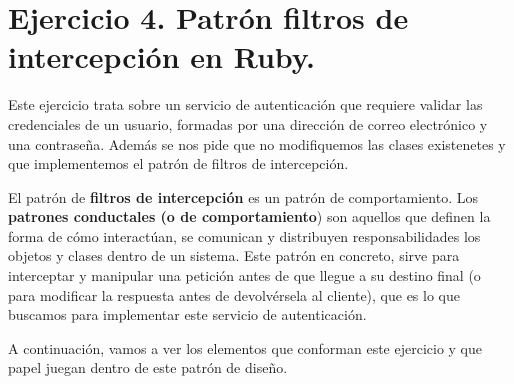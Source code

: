 \documentclass[a4paper,12pt]{article}
\begin{document}
		\newpage
	
	\section{Ejercicio 4. Patrón filtros de intercepción en Ruby.}
		Este ejercicio trata sobre un servicio de autenticación que requiere validar las credenciales de un usuario, formadas por una dirección de correo electrónico y una contraseña. Además se nos pide que no modifiquemos las clases existenetes y que implementemos el patrón de filtros de intercepción.
		
		El patrón de \textbf{filtros de intercepción} es un patrón de comportamiento. Los\textbf{ patrones conductales (o de comportamiento}) son aquellos que definen la forma de cómo interactúan, se comunican y distribuyen responsabilidades los objetos y clases dentro de un sistema. Este patrón en concreto, sirve para interceptar y manipular una petición antes de que llegue a su destino final (o para modificar la respuesta antes de devolvérsela al cliente), que es lo que buscamos para implementar este servicio de autenticación.
		
		A continuación, vamos a ver los elementos que conforman este ejercicio y que papel juegan dentro de este patrón de diseño.
		
\end{document}
